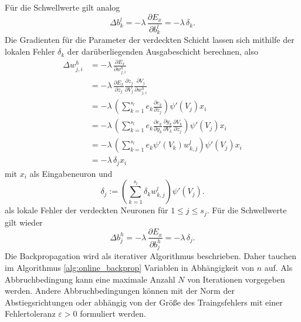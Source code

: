 Für die Schwellwerte gilt analog
\begin{equation*}
    \Delta b_k^l = -\lambda \, \frac{\partial E_x}{\partial b_{k}^l} 
                 = -\lambda \, \delta_k.
\end{equation*}
Die Gradienten für die Parameter der verdeckten Schicht lassen sich mithilfe der lokalen Fehler $\delta_k$ der darüberliegenden Ausgabeschicht berechnen, also
\begin{align*}
    \Delta w_{j,i}^h &= -\lambda\,\frac{\partial E_x}{\partial w_{j,i}^h} \\
                     &= -\lambda\,\frac{\partial E_x}{\partial z_{j}}
                            \frac{\partial z_j}{\partial V_j} 
                            \frac{\partial V_j}{\partial w_{j,i}^h} \\
                    &= -\lambda \,\left( \sum_{k=1}^{s_l} e_k \frac{\partial e_k}{\partial z_j}\right) \psi'(V_j) x_i \\
                    &= -\lambda \,\left( \sum_{k=1}^{s_l} e_k \frac{\partial e_k}{\partial y_k} \frac{\partial y_k}{\partial V_k} \frac{\partial V_k}{\partial z_j}\right) \psi'(V_j) x_i \\
                    &= -\lambda \,\left( \sum_{k=1}^{s_l} e_k \psi'(V_k) w_{k,j}^l \right) \psi'(V_j) x_i \\
                    &= -\lambda \, \delta_j x_i
\end{align*}
mit $x_i$ als Eingabeneuron und
\begin{equation*}
    \label{eq:delta_hidden}
    \delta_j:= \left(\sum_{k=1}^{s_l} \delta_k w_{k,j}^l\right) \psi'(V_j).
\end{equation*}
als lokale Fehler der verdeckten Neuronen für $1 \leq j \leq s_j$.
Für die Schwellwerte gilt wieder
\begin{equation*}
    \Delta b_j^h = -\lambda \, \frac{\partial E_x}{\partial b_{j}^h} 
                 = -\lambda \, \delta_j.
\end{equation*}
Die Backpropagation wird als iterativer Algorithmus beschrieben. Daher tauchen im Algorithmus \ref{alg:online_backprop} Variablen in Abhängigkeit von $n$ auf. Als Abbruchbedingung kann eine maximale Anzahl $N$ von Iterationen vorgegeben werden. Andere Abbruchbedingungen können mit der Norm der Abstiegsrichtungen oder abhängig von der Größe des Traingsfehlers mit einer Fehlertoleranz $\varepsilon >0$ formuliert werden.

